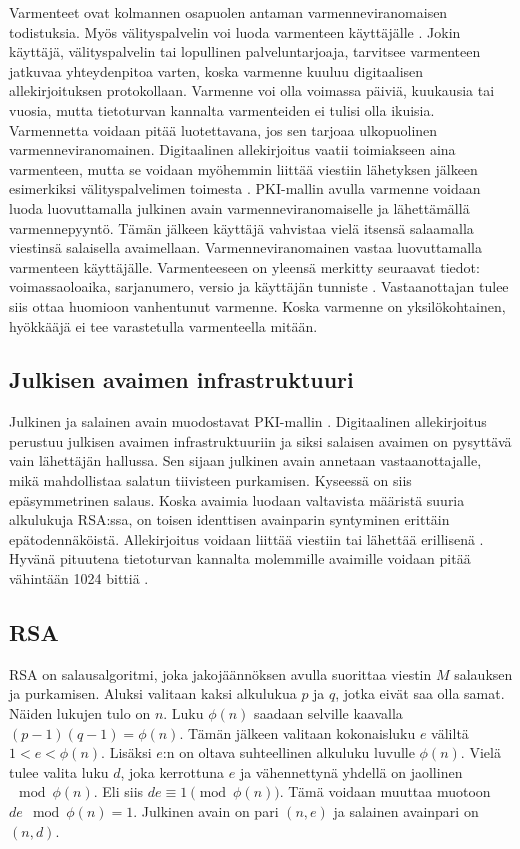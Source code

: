 \documentclass[finnish]{tktltiki2}
\theoremstyle{definition}
\theoremstyle{remark}
\begin{document}
Varmenteet ovat kolmannen osapuolen antaman varmenneviranomaisen todistuksia. Myös välityspalvelin voi luoda varmenteen käyttäjälle \cite{proxy}. Jokin käyttäjä, välityspalvelin tai lopullinen palveluntarjoaja, tarvitsee varmenteen jatkuvaa yhteydenpitoa varten, koska varmenne kuuluu digitaalisen allekirjoituksen protokollaan. Varmenne voi olla voimassa päiviä, kuukausia tai vuosia, mutta tietoturvan kannalta varmenteiden ei tulisi olla ikuisia. Varmennetta voidaan pitää luotettavana, jos sen tarjoaa ulkopuolinen varmenneviranomainen. Digitaalinen allekirjoitus vaatii toimiakseen aina varmenteen, mutta se voidaan myöhemmin liittää viestiin lähetyksen jälkeen esimerkiksi välityspalvelimen toimesta \cite{proxy}. PKI-mallin avulla varmenne voidaan luoda luovuttamalla julkinen avain varmenneviranomaiselle ja lähettämällä varmennepyyntö. Tämän jälkeen käyttäjä vahvistaa vielä itsensä salaamalla viestinsä salaisella avaimellaan. Varmenneviranomainen vastaa luovuttamalla varmenteen käyttäjälle. Varmenteeseen on yleensä merkitty seuraavat tiedot: voimassaoloaika, sarjanumero, versio ja käyttäjän tunniste \cite{ECC}. Vastaanottajan tulee siis ottaa huomioon vanhentunut varmenne. Koska varmenne on yksilökohtainen, hyökkääjä ei tee varastetulla varmenteella mitään.


\subsection{Julkisen avaimen infrastruktuuri}

Julkinen ja salainen avain muodostavat PKI-mallin \cite{ECC}. Digitaalinen allekirjoitus perustuu julkisen avaimen infrastruktuuriin ja siksi salaisen avaimen on pysyttävä vain lähettäjän hallussa. Sen sijaan julkinen avain annetaan vastaanottajalle, mikä mahdollistaa salatun tiivisteen purkamisen. Kyseessä on siis epäsymmetrinen salaus. Koska avaimia luodaan valtavista määristä suuria alkulukuja RSA:ssa, on toisen identtisen avainparin syntyminen erittäin epätodennäköistä. Allekirjoitus voidaan liittää viestiin tai lähettää erillisenä \cite{moen}. Hyvänä pituutena tietoturvan kannalta molemmille avaimille voidaan pitää vähintään 1024 bittiä \cite{ECC}. 

\subsection{RSA}

RSA on salausalgoritmi, joka jakojäännöksen avulla suorittaa viestin $M$ salauksen ja purkamisen. Aluksi valitaan kaksi alkulukua $p$ ja $q$, jotka eivät saa olla samat. Näiden lukujen tulo on $n$. Luku $\phi(n)$ saadaan selville kaavalla $(p-1)(q-1) = \phi(n)$. Tämän jälkeen valitaan kokonaisluku $e$ väliltä $1 < e < \phi(n)$. Lisäksi $e$:n on oltava suhteellinen alkuluku luvulle $\phi(n)$. Vielä tulee valita luku $d$, joka kerrottuna $e$ ja vähennettynä yhdellä on jaollinen$\mod{\phi(n)}$. Eli siis $d e \equiv 1\pmod{\phi(n)}$. Tämä voidaan muuttaa muotoon $de \mod{\phi(n)} = 1$. Julkinen avain on pari $(n, e)$ ja salainen avainpari on $(n, d)$.   
\end{document}
